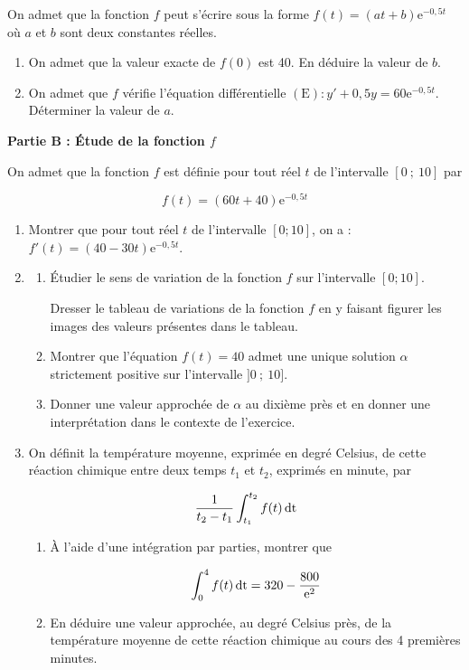 \documentclass[10pt]{article}
\providecommand{\e}{{\mathrm{e}}}
\begin{document}
On admet que la fonction $f$ peut s'écrire sous la forme $f(t) = (at + b)\e^{-0,5 t}$ où $a$ et $b$ sont deux constantes réelles.

\begin{enumerate}[start=2]
	\item On admet que la valeur exacte de $f(0)$ est 40. En déduire la valeur de $b$.
	\item On admet que $f$ vérifie l'équation différentielle $(\mathrm{E}): y'+ 0,5 y= 60 \e^{-0,5 t}$. Déterminer la valeur de $a$.
\end{enumerate}
\medskip 

\textbf{Partie B : Étude de la fonction $f$}
\medskip 

On admet que la fonction $f$ est définie pour tout réel $t$ de l'intervalle $[0~;~10]$ par

\[f(t) = (60 t+ 40)\e^{-0,5 t}\]

\smallskip

\begin{enumerate}
\item Montrer que pour tout réel $t$ de l'intervalle $[0 ; 10]$, on a : $f'(t)=(40-30 t) \e^{-0,5 t}$.
\item
	\begin{enumerate}
		\item Étudier le sens de variation de la fonction $f$ sur l'intervalle $[0 ; 10]$.


Dresser le tableau de variations de la fonction $f$ en y faisant figurer les images des valeurs présentes dans le tableau.

		\item Montrer que l'équation $f(t) = 40$ admet une unique solution $\alpha$ strictement positive sur l'intervalle $]0~;~10]$.
		\item Donner une valeur approchée de $\alpha$ au dixième près et en donner une interprétation dans le contexte de l'exercice.
	\end{enumerate}
\item On définit la température moyenne, exprimée en degré Celsius, de cette réaction chimique entre deux temps $t_{1}$ et $t_{2}$, exprimés en minute, par

\[\dfrac{1}{t_{2}-t_{1}} \int_{t_{1}}^{t_{2}} f(t)\,\rm{d} t\]

	\begin{enumerate}
		\item À l'aide d'une intégration par parties, montrer que

\[\int_{0}^{4} f(t) \, \rm{d}t=320-\dfrac{800}{\e^{2}}\]

		\item En déduire une valeur approchée, au degré Celsius près, de la température moyenne de cette réaction chimique au cours des 4 premières minutes.
	\end{enumerate}
\end{enumerate}
\end{document}
